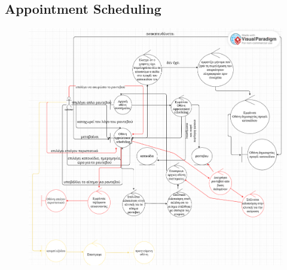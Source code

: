 \documentclass[12pt,a4paper,twoside]{book}
\begin{document}
\subsection{Appointment Scheduling}
\begin{figure}[H]
    \centering
    \includegraphics[width=\textwidth]{Resources/Robustness Diagram/appointment-scheduling.png}\label{fig:robustness-appointment-scheduling}
\end{figure}
\end{document}
